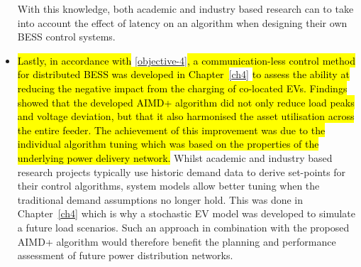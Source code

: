 \begin{itemize}
	With this knowledge, both academic and industry based research can to take into account the effect of latency on an algorithm when designing their own BESS control systems.
	\item
	\hl{Lastly, in accordance with }\ref{objective-4}\hl{, a communication-less control method for distributed BESS was developed in Chapter~}\ref{ch4}\hl{ to assess the ability at reducing the negative impact from the charging of co-located EVs.
	Findings showed that the developed AIMD+ algorithm did not only reduce load peaks and voltage deviation, but that it also harmonised the asset utilisation across the entire feeder.
	The achievement of this improvement was due to the individual algorithm tuning which was based on the properties of the underlying power delivery network.}
	Whilst academic and industry based research projects typically use historic demand data to derive set-points for their control algorithms, system models allow better tuning when the traditional demand assumptions no longer hold.
	This was done in Chapter~\ref{ch4} which is why a stochastic EV model was developed to simulate a future load scenarios.
	Such an approach in combination with the proposed AIMD+ algorithm would therefore benefit the planning and performance assessment of future power distribution networks.
\end{itemize}







